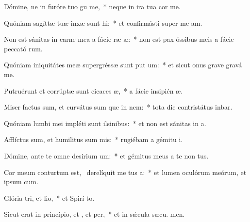 \item Dómine, ne in furóre tuo gu me,~* neque in ira tua cor me.
\item Quóniam sagíttæ tuæ inxæ sunt hi:~* et confirmásti super me  am.
\item Non est sánitas in carne mea a fácie ræ æ:~* non est pax óssibus meis a fácie peccató rum.
\item Quóniam iniquitátes meæ supergréssæ sunt put um:~* et sicut onus grave gravá   me.
\item Putruérunt et corrúptæ sunt cicaces æ,~* a fácie insipién æ.
\item Miser factus sum, et curvátus sum que in nem:~* tota die contristátus inbar.
\item Quóniam lumbi mei impléti sunt ilsinibus:~* et non est sánitas in  a.
\item Afflíctus sum, et humilitus sum mis:~* rugiébam a gémitu  i.
\item Dómine, ante te omne desirium um:~* et gémitus meus a te non  tus.
\item Cor meum conturtum est,~\pscross{} derelíquit me tus a:~* et lumen oculórum meórum, et ipsum   cum.
\item Glória tri, et lio,~* et Spirí to.
\item Sicut erat in princípio, et , et per,~* et in sǽcula sæcu. men.
